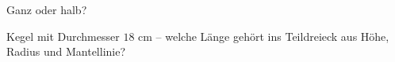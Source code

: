\setcounter{aufgabe}{20}

\begin{aufgabe}{Ganz oder halb?}
\begin{teile}
\teil Kegel mit Durchmesser $18$ cm – welche Länge gehört ins Teildreieck aus Höhe, Radius und Mantellinie? \\  \\ 
\end{teile}
\end{aufgabe}

